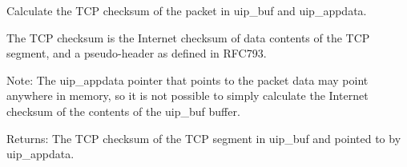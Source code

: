 Calculate the TCP checksum of the packet in uip\_\-buf and uip\_\-appdata. 

The TCP checksum is the Internet checksum of data contents of the TCP segment, and a pseudo-header as defined in RFC793.

\begin{Desc}
\item[Note:]The uip\_\-appdata pointer that points to the packet data may point anywhere in memory, so it is not possible to simply calculate the Internet checksum of the contents of the uip\_\-buf buffer.\end{Desc}
\begin{Desc}
\item[Returns:]The TCP checksum of the TCP segment in uip\_\-buf and pointed to by uip\_\-appdata. \end{Desc}
